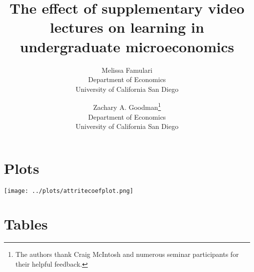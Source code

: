 \documentclass[10pt, letterpaper, landscape]{article}
\title{The effect of supplementary video lectures on learning in undergraduate microeconomics}
\author{%
	Melissa Famulari\\
	\small Department of Economics\\
	\small University of California San Diego\\
	\and
	Zachary A. Goodman\thanks{The authors thank Craig McIntosh and numerous seminar participants for their helpful feedback.}\\
	\small Department of Economics\\
	\small University of California San Diego\\
}
\begin{document}

\newpage


	
%
{}
\pagediagram   %
\pagevalues
\currentpage

\section{Plots} \bigskip

\texttt{[image: ../plots/attritecoefplot.png]}



\section{Tables} \newpage






















%
\end{document}
